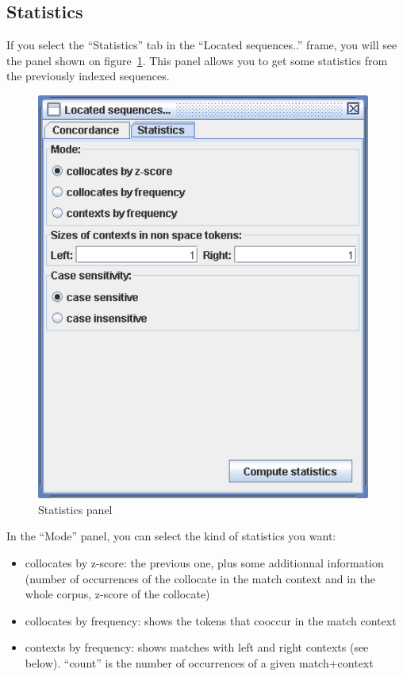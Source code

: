 \clearpage
\subsection{Statistics}
\label{section-statistics}
If you select the ``Statistics'' tab in the ``Located sequences..''
frame, you will see the panel shown on figure~\ref{fig-statistics}. This panel
allows you to get some statistics from the previously indexed sequences. 

\bigskip
\begin{figure}[!h]
\begin{center}
\includegraphics[width=11cm]{resources/img/fig4-9.png}
\caption{Statistics panel\label{fig-statistics}}
\end{center}
\end{figure}

\bigskip
\noindent In the ``Mode'' panel, you can select the kind of statistics you want:
\begin{itemize}
  \item collocates by z-score: the previous one, plus some additionnal
  information (number of occurrences of the collocate in the match context and
  in the whole corpus, z-score of the collocate)
  \item collocates by frequency: shows the tokens that cooccur in the match
  context
  \item contexts by frequency: shows matches with left and right contexts (see
  below). ``count'' is the number of occurrences of a given match+context
\end{itemize}

